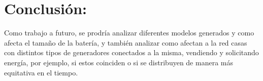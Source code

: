 \section{Conclusión:}

Como trabajo a futuro, se prodría analizar diferentes modelos generados y como afecta el tamaño de la
batería, y también analizar como afectan a la red casas con distintos tipos de generadores conectados 
a la misma, vendiendo y solicitando energía, por ejemplo, si estos coinciden o si se distribuyen de
manera más equitativa en el tiempo.
